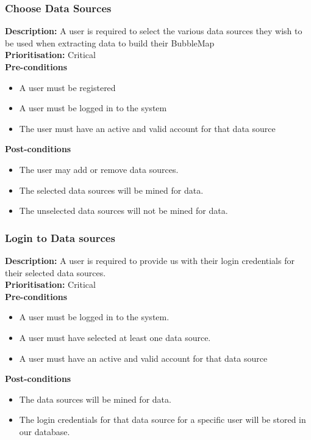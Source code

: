 \documentclass[hidelinks,english]{article}
\begin{document}
    \subsubsection{Choose Data Sources}
	\textbf{Description:}  A user is required to select the various data sources they wish to be used when extracting data to build their BubbleMap
	\\
    \textbf{Prioritisation:} Critical\\
    
    
      \textbf{Pre-conditions}
    \begin{itemize}
        \item A user must be registered
        \item A user must be logged in to the system
        \item The user must have an active and valid account for that data source
    \end{itemize}
    
    \textbf{Post-conditions}
     \begin{itemize}
        \item The user may add or remove data sources.
        \item The selected data sources will be mined for data.
        \item The unselected data sources will not be mined for data.
    \end{itemize}
    
    \subsubsection{Login to Data sources}
	\textbf{Description:}  A user is required to provide us with their login credentials for their selected data sources. 
	\\
    \textbf{Prioritisation:} Critical\\
    
    
      \textbf{Pre-conditions}
    \begin{itemize}
        \item A user must be logged in to the system.
        \item A user must have selected at least one data source.
        \item A user must have an active and valid account for that data source
    \end{itemize}
    
    \textbf{Post-conditions}
     \begin{itemize}
        \item The data sources will be mined for data.
        \item The login credentials for that data source for a specific user will be stored in our database.
    \end{itemize}
    
\end{document}
